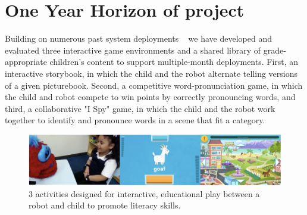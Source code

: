 



\section{One Year Horizon of project}

Building on numerous past system deployments ~\cite{park2017hri-bc, gordon2016affective, westlund2017flat} we have developed and evaluated three interactive game environments and a shared library of grade-appropriate children's content to support multiple-month deployments. First, an interactive storybook, in which the child and the robot alternate telling versions of a given picturebook. Second, a competitive word-pronunciation game, in which the child and robot compete to win points by correctly pronouncing words, and third, a collaborative "I Spy" game, in which the child and the robot work together to identify and pronounce words in a scene that fit a category.

\begin{figure}%
  \centering
  \includegraphics[width=1.0\textwidth]{fig/game_screens.png}  
  \caption{3 activities designed for interactive, educational play between a robot and child to promote literacy skills.}
  \label{fig:robots}
\end{figure}


